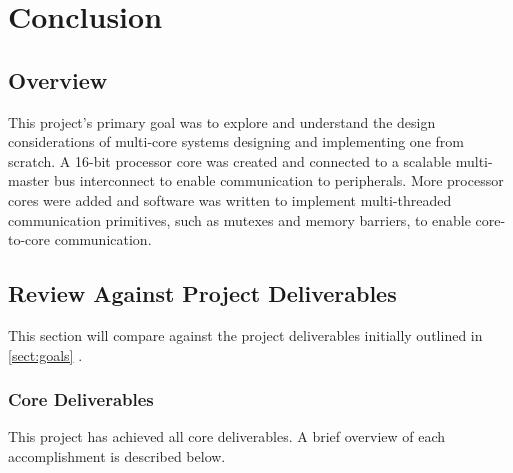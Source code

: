 \chapter{Conclusion}
\startcontents[chapters]

\section{Overview}
This project's primary goal was to explore and understand the design considerations of multi-core systems designing and implementing one from scratch. A 16-bit processor core was created and connected to a scalable multi-master bus interconnect to enable communication to peripherals. More processor cores were added and software was written to implement multi-threaded communication primitives, such as mutexes and memory barriers, to enable core-to-core communication.

\section{Review Against Project Deliverables}
This section will compare against the project deliverables initially outlined in \cref{sect:goals} .
\subsection{Core Deliverables}
This project has achieved all core deliverables. A brief overview of each accomplishment is described below.

